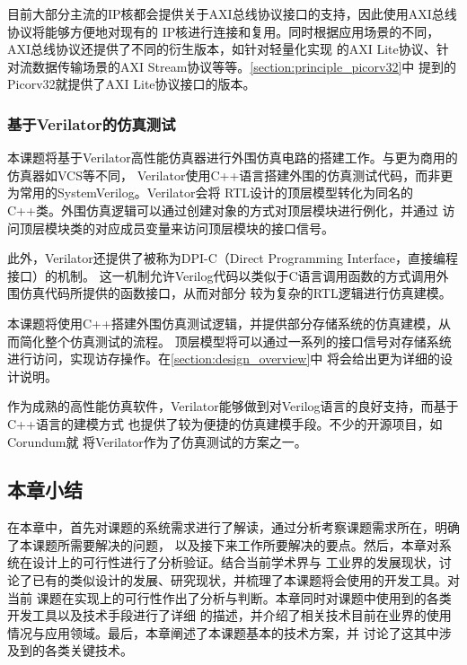 
目前大部分主流的IP核都会提供关于AXI总线协议接口的支持，因此使用AXI总线协议将能够方便地对现有的
IP核进行连接和复用。同时根据应用场景的不同，AXI总线协议还提供了不同的衍生版本，如针对轻量化实现
的AXI Lite协议、针对流数据传输场景的AXI Stream协议等等。\autoref{section:principle_picorv32}中
提到的Picorv32就提供了AXI Lite协议接口的版本。

\subsubsection{基于Verilator的仿真测试}

本课题将基于Verilator高性能仿真器进行外围仿真电路的搭建工作。与更为商用的仿真器如VCS等不同，
Verilator使用C++语言搭建外围的仿真测试代码，而非更为常用的SystemVerilog。Verilator会将
RTL设计的顶层模型转化为同名的C++类。外围仿真逻辑可以通过创建对象的方式对顶层模块进行例化，并通过
访问顶层模块类的对应成员变量来访问顶层模块的接口信号。

此外，Verilator还提供了被称为DPI-C（Direct Programming Interface，直接编程接口）的机制。
这一机制允许Verilog代码以类似于C语言调用函数的方式调用外围仿真代码所提供的函数接口，从而对部分
较为复杂的RTL逻辑进行仿真建模。

本课题将使用C++搭建外围仿真测试逻辑，并提供部分存储系统的仿真建模，从而简化整个仿真测试的流程。
顶层模型将可以通过一系列的接口信号对存储系统进行访问，实现访存操作。在\autoref{section:design_overview}中
将会给出更为详细的设计说明。

作为成熟的高性能仿真软件，Verilator能够做到对Verilog语言的良好支持，而基于C++语言的建模方式
也提供了较为便捷的仿真建模手段。不少的开源项目，如Corundum\cite{forencich2020corundum}就
将Verilator作为了仿真测试的方案之一。

\subsection{本章小结}

在本章中，首先对课题的系统需求进行了解读，通过分析考察课题需求所在，明确了本课题所需要解决的问题，
以及接下来工作所要解决的要点。然后，本章对系统在设计上的可行性进行了分析验证。结合当前学术界与
工业界的发展现状，讨论了已有的类似设计的发展、研究现状，并梳理了本课题将会使用的开发工具。对当前
课题在实现上的可行性作出了分析与判断。本章同时对课题中使用到的各类开发工具以及技术手段进行了详细
的描述，并介绍了相关技术目前在业界的使用情况与应用领域。最后，本章阐述了本课题基本的技术方案，并
讨论了这其中涉及到的各类关键技术。
